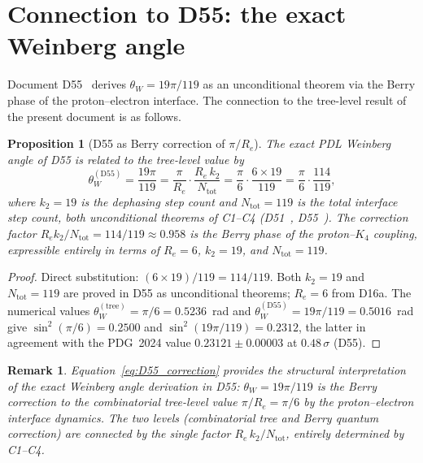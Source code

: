 \documentclass[11pt,a4paper]{article}
\newtheorem{proposition}{Proposition}[section]
\newtheorem{remark}{Remark}[section]
\newcommand{\Kfour}{K_4}
\newcommand{\Retot}{R_e}
\newcommand{\thetaW}{\theta_W}
\begin{document}
\section{Connection to D55: the exact Weinberg angle}
\label{sec:D55}

Document D55~\cite{PDL_D55} derives $\thetaW = 19\pi/119$ as an unconditional theorem via the Berry phase of the proton--electron interface. The connection to the tree-level result of the present document is as follows.

\begin{proposition}[D55 as Berry correction of $\pi/\Retot$]
\label{prop:D55_correction}
The exact PDL Weinberg angle of D55 is related to the tree-level value by
\begin{equation}
\thetaW^{(\mathrm{D55})} = \frac{19\pi}{119} = \frac{\pi}{\Retot} \cdot \frac{\Retot \, k_2}{N_{\mathrm{tot}}} = \frac{\pi}{6} \cdot \frac{6 \times 19}{119} = \frac{\pi}{6} \cdot \frac{114}{119},
\label{eq:D55_correction}
\end{equation}
where $k_2 = 19$ is the dephasing step count and $N_{\mathrm{tot}} = 119$ is the total interface step count, both unconditional theorems of C1--C4 (D51~\cite{PDL_D51}, D55~\cite{PDL_D55}). The correction factor $\Retot k_2 / N_{\mathrm{tot}} = 114/119 \approx 0.958$ is the Berry phase of the proton--$\Kfour$ coupling, expressible entirely in terms of $\Retot = 6$, $k_2 = 19$, and $N_{\mathrm{tot}} = 119$.
\end{proposition}

\begin{proof}
Direct substitution: $(6 \times 19)/119 = 114/119$. Both $k_2 = 19$ and $N_{\mathrm{tot}} = 119$ are proved in D55 as unconditional theorems; $\Retot = 6$ from D16a. The numerical values $\thetaW^{(\mathrm{tree})} = \pi/6 = 0.5236$~rad and $\thetaW^{(\mathrm{D55})} = 19\pi/119 = 0.5016$~rad give $\sin^2(\pi/6) = 0.2500$ and $\sin^2(19\pi/119) = 0.2312$, the latter in agreement with the PDG~2024 value $0.23121 \pm 0.00003$ at $0.48\,\sigma$ (D55).
\end{proof}

\begin{remark}
Equation~\eqref{eq:D55_correction} provides the structural interpretation of the exact Weinberg angle derivation in D55: $\thetaW = 19\pi/119$ is the Berry correction to the combinatorial tree-level value $\pi/\Retot = \pi/6$ by the proton--electron interface dynamics. The two levels (combinatorial tree and Berry quantum correction) are connected by the single factor $\Retot \, k_2 / N_{\mathrm{tot}}$, entirely determined by C1--C4.
\end{remark}
\end{document}
